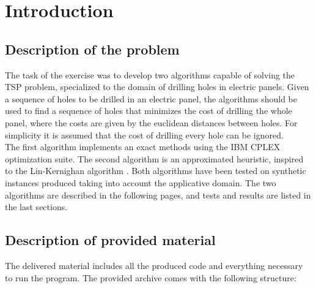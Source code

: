 
\section{Introduction}
\label{chap:introduction}

\subsection{Description of the problem}
The task of the exercise was to develop two algorithms capable of solving the TSP problem, specialized to the domain of drilling holes in electric panels. Given a sequence of holes to be drilled in an electric panel, the algorithms should be used to find a sequence of holes that minimizes the cost of drilling the whole panel, where the costs are given by the euclidean distances between holes. For simplicity it is assumed that the cost of drilling every hole can be ignored.\\ 
The first algorithm implements an exact methods using the IBM CPLEX optimization suite. The second algorithm is an approximated heuristic, inspired to the Lin-Kernighan algorithm \cite{LinK73}. Both algorithms have been tested on synthetic instances produced taking into account the applicative domain. The two algorithms are described in the following pages, and tests and results are listed in the last sections.

\subsection{Description of provided material}
The delivered material includes all the produced code and everything necessary to run the program.
The provided archive comes with the following structure:
\renewcommand*\DTstylecomment{\rmfamily\color{blue}\textit}

